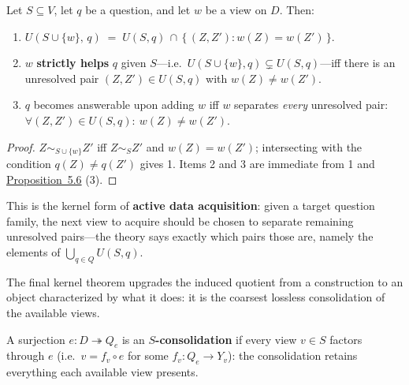 
\begin{thmplain}

Let \(S \subseteq V\), let \(q\) be a question, and let \(w\) be a view on \(D\). Then:

\begin{enumerate}
\def\labelenumi{\arabic{enumi}.}
\tightlist
\item
  \(U(S \cup \{w\},\, q) \;=\; U(S, q) \,\cap\, \{\, (Z,Z') : w(Z) = w(Z') \,\}\).
\item
  \(w\) \textbf{strictly helps} \(q\) given \(S\)---\hspace{0pt}i.e.~\(U(S \cup \{w\}, q) \subsetneq U(S, q)\)---\hspace{0pt}iff there is an unresolved pair \((Z, Z') \in U(S, q)\) with \(w(Z) \neq w(Z')\).
\item
  \(q\) becomes answerable upon adding \(w\) iff \(w\) separates \emph{every} unresolved pair: \(\forall (Z,Z') \in U(S,q):\ w(Z) \neq w(Z')\).
\end{enumerate}
\end{thmplain}

\begin{proof}

\(Z \sim_{S \cup \{w\}} Z'\) iff \(Z \sim_S Z'\) and \(w(Z) = w(Z')\); intersecting with the condition \(q(Z) \neq q(Z')\) gives 1. Items 2 and 3 are immediate from 1 and \hyperlink{stmt:5.6}{Proposition~5.6} (3).
\end{proof}

This is the kernel form of \textbf{active data acquisition}: given a target question family, the next view to acquire should be chosen to separate remaining unresolved pairs---\hspace{0pt}the theory says exactly which pairs those are, namely the elements of \(\bigcup_{q \in Q} U(S, q)\).


The final kernel theorem upgrades the induced quotient from a construction to an object characterized by what it does: it is the coarsest lossless consolidation of the available views.

\begin{thmdef}

A surjection \(e : D \twoheadrightarrow Q_e\) is an \textbf{\(S\)-consolidation} if every view \(v \in S\) factors through \(e\) (i.e.~\(v = f_v \circ e\) for some \(f_v : Q_e \to Y_v\)): the consolidation retains everything each available view presents.
\end{thmdef}

